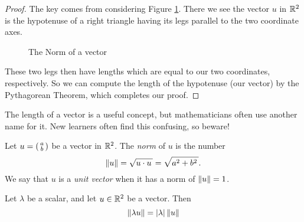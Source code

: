 \documentclass[elementsmain.tex]{subfiles}
\begin{document}
\begin{proof}
The key comes from considering Figure \ref{fig:norm}. 
There we see the vector $u$ in $\mathbb{R}^2$ is the hypotenuse of a right triangle 
having its legs parallel to the two coordinate axes.

\begin{figure}[h!]
\centering
{}
\caption{The Norm of a vector}
\label{fig:norm}
\end{figure}

These two legs then have lengths which are equal to our two coordinates, respectively.
So we can compute the length of the hypotenuse (our vector) by the Pythagorean Theorem, which completes our proof.
\end{proof}

The length of a vector is a useful concept, but mathematicians often use another name for it. New learners often find this confusing, so beware!

\begin{definition}
Let $u = \left(\begin{smallmatrix} a \\ b \end{smallmatrix}\right)$ be a vector in $\mathbb{R}^2$.
The \emph{norm} of $u$ is the number
\[
\left\|u\right\| = \sqrt{u\cdot u\,} = \sqrt{a^2 + b^2\,}.
\]
We say that $u$ is a \emph{unit vector} when it has a norm of $\left\|u\right\|=1$.
\end{definition}




\begin{theorem}
Let $\lambda$ be a scalar, and let $u\in \mathbb{R}^2$ be a vector. Then
\[
\left\|\lambda u\right\|
= |\lambda| \left\|u\right\|
\]

\end{theorem}
\end{document}
